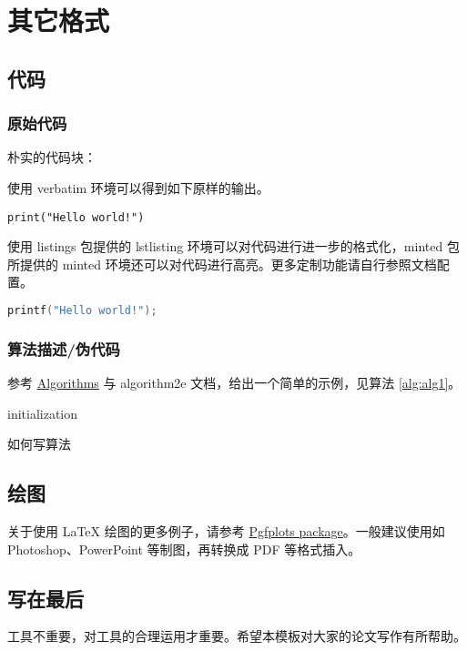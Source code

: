 \chapter{其它格式}
\section{代码}
\subsection{原始代码}
朴实的代码块：

使用 verbatim 环境可以得到如下原样的输出。
\begin{verbatim}
print("Hello world!")
\end{verbatim}

使用 listings 包提供的 lstlisting 环境可以对代码进行进一步的格式化，minted 包所提供的 minted 环境还可以对代码进行高亮。更多定制功能请自行参照文档配置。

\begin{lstlisting}[language=c, caption=C语言代码]
    printf("Hello world!");
\end{lstlisting}

\subsection{算法描述/伪代码}
参考 \href{https://en.wikibooks.org/wiki/LaTeX/Algorithms}{Algorithms} 与 algorithm2e 文档，给出一个简单的示例，见算法 \ref{alg:alg1}。

\begin{algorithm}[H]
  \SetAlgoLined
  initialization\;
  \caption{如何写算法}\label{alg:alg1}
\end{algorithm}

\section{绘图}
关于使用 \LaTeX{} 绘图的更多例子，请参考 \href{https://www.overleaf.com/learn/latex/Pgfplots_package}{Pgfplots package}。一般建议使用如 Photoshop、PowerPoint 等制图，再转换成 PDF 等格式插入。

\section{写在最后}
工具不重要，对工具的合理运用才重要。希望本模板对大家的论文写作有所帮助。
